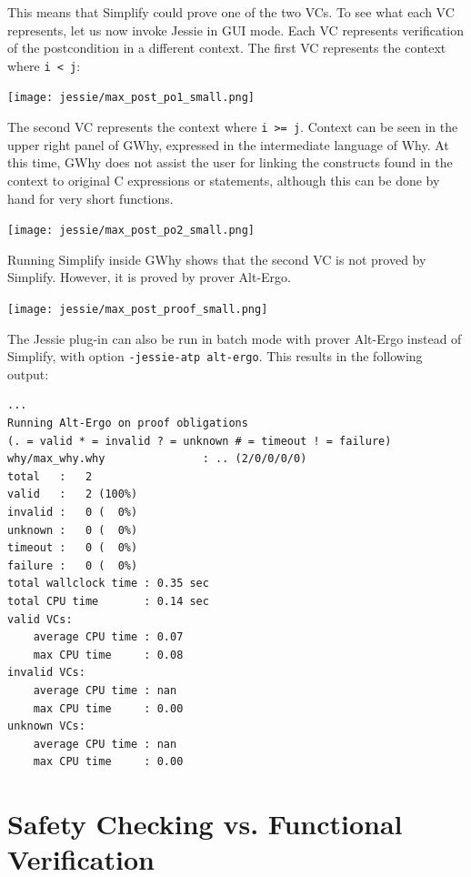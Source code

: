 \documentclass[a4paper,11pt,twoside,openright]{report}
\begin{document}
This means that Simplify could prove one of the two VCs. To see
what each VC represents, let us now invoke Jessie in GUI
mode. Each VC represents verification of the postcondition in a
different context. The first VC represents the context where
\verb|i < j|:

\begin{center}
  \texttt{[image: jessie/max\_post\_po1\_small.png]}
\end{center}

The second VC represents the context where \verb|i >= j|.  Context can
be seen in the upper right panel of GWhy, expressed in the
intermediate language of Why. At this time, GWhy does not assist
the user for linking the constructs found in the context to 
original C expressions or statements, although this can be done
by hand for very short functions.

\begin{center}
  \texttt{[image: jessie/max\_post\_po2\_small.png]}
\end{center}

Running Simplify inside GWhy shows that the second VC is not proved by
Simplify. However, it is proved by prover Alt-Ergo.

\begin{center}
  \texttt{[image: jessie/max\_post\_proof\_small.png]}
\end{center}

The Jessie plug-in can also be run in batch mode with prover Alt-Ergo
instead of Simplify, with option \verb|-jessie-atp alt-ergo|. This
results in the following output:

\begin{verbatim}
...
Running Alt-Ergo on proof obligations
(. = valid * = invalid ? = unknown # = timeout ! = failure)
why/max_why.why               : .. (2/0/0/0/0)
total   :   2
valid   :   2 (100%)
invalid :   0 (  0%)
unknown :   0 (  0%)
timeout :   0 (  0%)
failure :   0 (  0%)
total wallclock time : 0.35 sec
total CPU time       : 0.14 sec
valid VCs:
    average CPU time : 0.07
    max CPU time     : 0.08
invalid VCs:
    average CPU time : nan
    max CPU time     : 0.00
unknown VCs:
    average CPU time : nan
    max CPU time     : 0.00
\end{verbatim}

\section{Safety Checking vs. Functional Verification}
\end{document}
